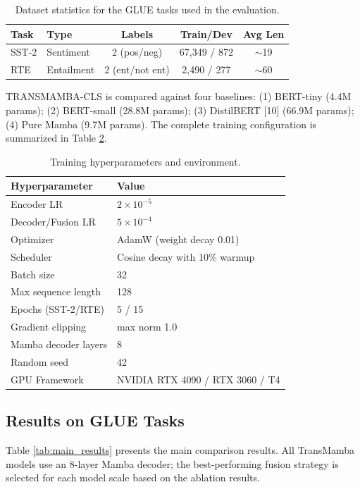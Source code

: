 \documentclass[10pt, conference]{IEEEtran}
\begin{document}
\begin{table}[htbp]
\caption{Dataset statistics for the GLUE tasks used in the evaluation.} %
\label{tab:dataset}
\centering
\begin{tabular}{llccc}
\toprule
\textbf{Task} & \textbf{Type} & \textbf{Labels} & \textbf{Train/Dev} & \textbf{Avg Len} \\ %
\midrule
SST-2 & Sentiment & 2 (pos/neg) & 67,349 / 872 & $\sim$19 \\ %
RTE & Entailment & 2 (ent/not ent) & 2,490 / 277 & $\sim$60 \\ %
\bottomrule
\end{tabular}
\end{table}

TRANSMAMBA-CLS is compared against four baselines: (1) BERT-tiny (4.4M params); (2) BERT-small (28.8M params); (3) DistilBERT [10] (66.9M params); (4) Pure Mamba (9.7M params). %
The complete training configuration is summarized in Table \ref{tab:hyper}. %

\begin{table}[htbp]
\caption{Training hyperparameters and environment.} %
\label{tab:hyper}
\centering
\begin{tabular}{ll}
\toprule
\textbf{Hyperparameter} & \textbf{Value} \\ %
\midrule
Encoder LR & $2\times 10^{-5}$ \\ %
Decoder/Fusion LR & $5\times 10^{-4}$ \\ %
Optimizer & AdamW (weight decay 0.01) \\ %
Scheduler & Cosine decay with 10\% warmup \\ %
Batch size & 32 \\ %
Max sequence length & 128 \\ %
Epochs (SST-2/RTE) & 5 / 15 \\ %
Gradient clipping & max norm 1.0 \\ %
Mamba decoder layers & 8 \\ %
Random seed & 42 \\ %
GPU Framework & NVIDIA RTX 4090 / RTX 3060 / T4 \\ %
\bottomrule
\end{tabular}
\end{table}

\subsection{Results on GLUE Tasks} %
Table \ref{tab:main_results} presents the main comparison results. All TransMamba models use an 8-layer Mamba decoder; the best-performing fusion strategy is selected for each model scale based on the ablation results. %
\end{document}
